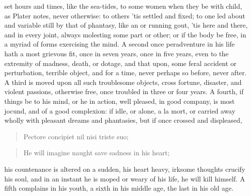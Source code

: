 {set hours and times, like the sea-tides, to some women when they be with child,
as Plater notes, never otherwise: to others 'tis settled
and fixed; to one led about and variable still by that  of
phantasy, like an  or running gout, 'tis here and there, and in
every joint, always molesting some part or other; or if the body be free, in a
myriad of forms exercising the mind. A second once peradventure in his life
hath a most grievous fit, once in seven years, once in five years, even to the
extremity of madness, death, or dotage, and that upon, some feral accident or
perturbation, terrible object, and for a time, never perhaps so before, never
after. A third is moved upon all such troublesome objects, cross fortune,
disaster, and violent passions, otherwise free, once troubled in three or four
years. A fourth, if things be to his mind, or he in action, well pleased, in
good company, is most jocund, and of a good complexion: if idle, or alone, a la
mort, or carried away wholly with pleasant dreams and phantasies, but if once
crossed and displeased,

\begin{latin}
\begin{verse}%
Pectore concipiet nil nisi triste suo;
\end{verse}%
\end{latin}
\translationrule
\begin{verse}%
He will imagine naught save sadness in his heart;
\end{verse}%

his countenance is altered on a sudden, his heart heavy, irksome thoughts
crucify his soul, and in an instant he is moped or weary of his life, he will
kill himself. A fifth complains in his youth, a sixth in his middle age, the
last in his old age.

}
